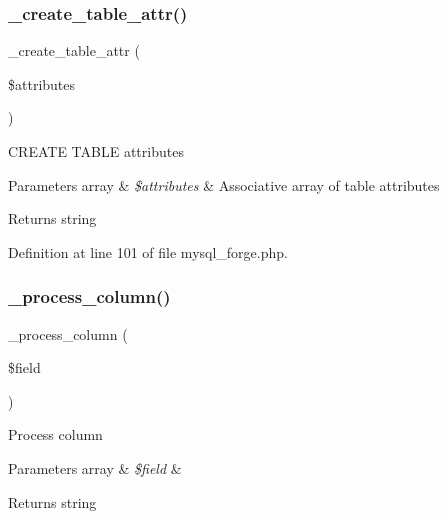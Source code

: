 \mbox{\label{class_c_i___d_b__mysql__forge_a10b25326d82f6ddd9af1935e52e42b72}} 
\subsubsection{\texorpdfstring{\_create\_table\_attr()}{\_create\_table\_attr()}}
{\footnotesize\ttfamily \+\_\+create\+\_\+table\+\_\+attr (\begin{DoxyParamCaption}\item[{}]{\$attributes }\end{DoxyParamCaption})\hspace{0.3cm}{\ttfamily [protected]}}

C\+R\+E\+A\+TE T\+A\+B\+LE attributes


\begin{DoxyParams}[1]{Parameters}
array & {\em \$attributes} & Associative array of table attributes \\
\hline
\end{DoxyParams}
\begin{DoxyReturn}{Returns}
string 
\end{DoxyReturn}


Definition at line 101 of file mysql\+\_\+forge.\+php.

\mbox{\label{class_c_i___d_b__mysql__forge_a8f38f1c5b5dddecca4befbe393f3f299}} 
\subsubsection{\texorpdfstring{\_process\_column()}{\_process\_column()}}
{\footnotesize\ttfamily \+\_\+process\+\_\+column (\begin{DoxyParamCaption}\item[{}]{\$field }\end{DoxyParamCaption})\hspace{0.3cm}{\ttfamily [protected]}}

Process column


\begin{DoxyParams}[1]{Parameters}
array & {\em \$field} & \\
\hline
\end{DoxyParams}
\begin{DoxyReturn}{Returns}
string 
\end{DoxyReturn}


